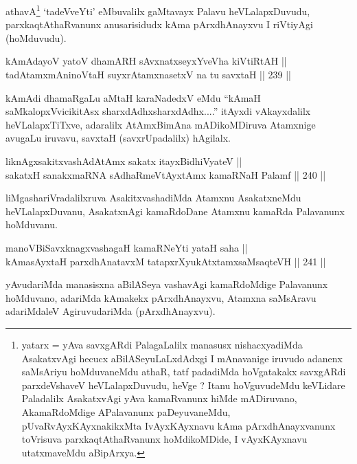 \begin{artha}
athavA\footnote{yatarx = yAva savxgARdi PalagaLalilx manasusx
nishacxyadiMda AsakatxvAgi hecucx aBilASeyuLaLxdAdxgi I mAnavanige
iruvudo adanenx saMsAriyu hoMduvaneMdu athaR, tatf padadiMda
hoVgatakakx savxgARdi parxdeVshaveV heVLalapxDuvudu, heVge ? Itanu
hoVguvudeMdu keVLidare Paladalilx AsakatxvAgi yAva kamaRvanunx hiMde
mADiruvano, AkamaRdoMdige APalavanunx paDeyuvaneMdu,
pUvaRvAyxKAyxnakikxMta IvAyxKAyxnavu kAma pArxdhAnayxvanunx
toVrisuva parxkaqtAthaRvanunx hoMdikoMDide, I vAyxKAyxnavu
utatxmaveMdu aBipArxya.} `tadeVveYti' eMbuvalilx gaMtavayx Palavu
heVLalapxDuvudu, parxkaqtAthaRvanunx anusarisidudx kAma pArxdhAnayxvu
I riVtiyAgi (hoMduvudu).
\end{artha}

\begin{shl}
kAmAdayoV yatoV dhamARH sAvxnatxseyxYveVha kiVtiRtAH || \\
tadAtamxmAninoV\s taH suyxrAtamxnasetxV na tu savxtaH \hfill || 239 ||  
\end{shl}

\begin{artha}
kAmAdi dhamaRgaLu aMtaH karaNadedxV eMdu ``kAmaH saMkalopxVvicikitAsx
sharxdAdhx\s sharxdAdhx....'' itAyxdi vAkayxdalilx heVLalapxTiTxve,
adaralilx AtAmxBimAna mADikoMDiruva Atamxnige avugaLu iruvavu, savxtaH
(savxrUpadalilx) hAgilalx.
\end{artha}

\begin{shl}
liknAgxsakitxvashAdAtAmx sakatx itayxBidhiVyateV || \\
sakatxH sanakxmaRNA sAdhaRmeVtAyxtAmx kamaRNaH Palamf \hfill || 240 ||  
\end{shl}

\begin{artha}
liMgashariVradalilxruva AsakitxvashadiMda Atamxnu AsakatxneMdu
heVLalapxDuvanu, AsakatxnAgi kamaRdoDane Atamxnu kamaRda Palavanunx
hoMduvanu.
\end{artha}

\begin{shl}
manoVBiSavxknagxvashagaH kamaRNeYti yataH saha || \\
kAmasAyxtaH parxdhAnatavxM tatapxrXyukAtxtamxsaMsaqteVH \hfill || 241 ||  
\end{shl}

\begin{artha}
yAvudariMda manasisxna aBilASeya vashavAgi kamaRdoMdige
Palavanunx hoMduvano, adariMda kAmakekx pArxdhAnayxvu, Atamxna
saMsAravu adariMdaleV AgiruvudariMda (pArxdhAnayxvu).
\end{artha}


